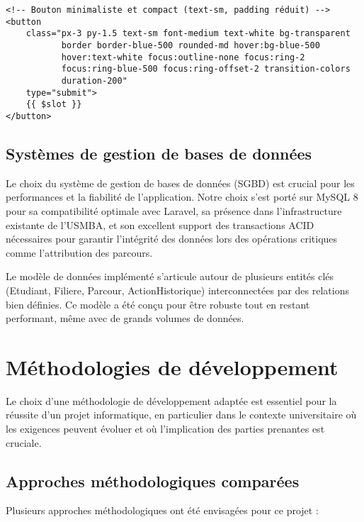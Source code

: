\documentclass[french,12pt]{report} %
\begin{document}
\begin{lstlisting}[style=htmlstyle,caption={Composant de bouton minimaliste avec Tailwind CSS}]
<!-- Bouton minimaliste et compact (text-sm, padding réduit) -->
<button 
    class="px-3 py-1.5 text-sm font-medium text-white bg-transparent 
           border border-blue-500 rounded-md hover:bg-blue-500 
           hover:text-white focus:outline-none focus:ring-2 
           focus:ring-blue-500 focus:ring-offset-2 transition-colors 
           duration-200"
    type="submit">
    {{ $slot }}
</button>
\end{lstlisting}

\subsection{Systèmes de gestion de bases de données}

Le choix du système de gestion de bases de données (SGBD) est crucial pour les performances et la fiabilité de l'application. Notre choix s'est porté sur MySQL 8 pour sa compatibilité optimale avec Laravel, sa présence dans l'infrastructure existante de l'USMBA, et son excellent support des transactions ACID nécessaires pour garantir l'intégrité des données lors des opérations critiques comme l'attribution des parcours.

Le modèle de données implémenté s'articule autour de plusieurs entités clés (Etudiant, Filiere, Parcour, ActionHistorique) interconnectées par des relations bien définies. Ce modèle a été conçu pour être robuste tout en restant performant, même avec de grands volumes de données.

\section{Méthodologies de développement}

Le choix d'une méthodologie de développement adaptée est essentiel pour la réussite d'un projet informatique, en particulier dans le contexte universitaire où les exigences peuvent évoluer et où l'implication des parties prenantes est cruciale.

\subsection{Approches méthodologiques comparées}

Plusieurs approches méthodologiques ont été envisagées pour ce projet :
\end{document}
